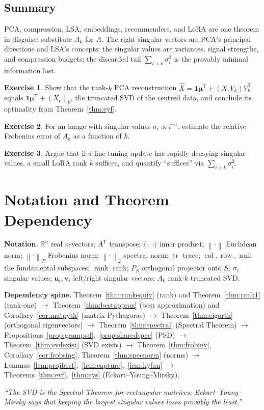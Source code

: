 \documentclass[11pt,oneside]{book}
\theoremstyle{plain}
\theoremstyle{definition}
\newtheorem{exercise}{Exercise}[chapter]
\theoremstyle{remark}
\newcommand{\R}{\mathbb{R}}
\newcommand{\tr}{\operatorname{tr}}
\newcommand{\rank}{\operatorname{rank}}
\newcommand{\col}{\operatorname{col}}
\newcommand{\row}{\operatorname{row}}
\newcommand{\nul}{\operatorname{null}}
\newcommand{\norm}[1]{\left\lVert #1 \right\rVert}
\newcommand{\fn}[1]{\norm{#1}_F}
\newcommand{\sn}[1]{\norm{#1}_2}
\newcommand{\T}{^{\mathsf T}}
\newcommand{\inner}[2]{\langle #1,\, #2\rangle}
\newcommand{\bu}{\mathbf{u}}
\newcommand{\bv}{\mathbf{v}}
\newcommand{\bmu}{\boldsymbol{\mu}}
\begin{document}
\section*{Summary}
PCA, compression, LSA, embeddings, recommenders, and LoRA are one theorem in disguise:
substitute $A_k$ for $A$. The right singular vectors are PCA's principal directions and
LSA's concepts; the singular values are variances, signal strengths, and compression
budgets; the discarded tail $\sum_{i>k}\sigma_i^2$ is the provably minimal information
lost.

\begin{exercise}
Show that the rank-$k$ PCA reconstruction $\hat X=\mathbf 1\bmu\T+(X_c V_k)V_k\T$ equals
$\mathbf 1\bmu\T+(X_c)_k$, the truncated SVD of the centred data, and conclude its
optimality from Theorem~\ref{thm:eyf}.
\end{exercise}
\begin{exercise}
For an image with singular values $\sigma_i\propto i^{-1}$, estimate the relative
Frobenius error of $A_k$ as a function of $k$.
\end{exercise}
\begin{exercise}
Argue that if a fine-tuning update has rapidly decaying singular values, a small LoRA
rank $k$ suffices, and quantify ``suffices'' via $\sum_{i>k}\sigma_i^2$.
\end{exercise}

\backmatter
\chapter{Notation and Theorem Dependency}

\textbf{Notation.}
$\R^n$ real $n$-vectors; $A\T$ transpose; $\inner{\cdot}{\cdot}$ inner product;
$\norm{\cdot}$ Euclidean norm; $\fn{\cdot}$ Frobenius norm; $\sn{\cdot}$ spectral norm;
$\tr$ trace; $\col,\row,\nul$ the fundamental subspaces; $\rank$ rank; $P_S$ orthogonal
projector onto $S$; $\sigma_i$ singular values; $\bu_i,\bv_i$ left/right singular
vectors; $A_k$ rank-$k$ truncated SVD.

\medskip
\noindent\textbf{Dependency spine.}
Theorem~\ref{thm:rankequiv} (rank) and Theorem~\ref{thm:rank1} (rank-one)
$\to$ Theorem~\ref{thm:bestapprox} (best approximation) and
Corollary~\ref{cor:matpyth} (matrix Pythagoras)
$\to$ Theorem~\ref{thm:eigorth} (orthogonal eigenvectors)
$\to$ Theorem~\ref{thm:spectral} (Spectral Theorem)
$\to$ Propositions~\ref{prop:grampsd},~\ref{prop:sharedspec} (PSD)
$\to$ Theorem~\ref{thm:svdexist} (SVD exists)
$\to$ Theorem~\ref{thm:frobinv}, Corollary~\ref{cor:frobsing},
Theorem~\ref{thm:specnorm} (norms)
$\to$ Lemmas~\ref{lem:projbest},~\ref{lem:capture},~\ref{lem:kyfan}
$\to$ Theorems~\ref{thm:eyf},~\ref{thm:eys} (Eckart--Young--Mirsky).

\vspace{1cm}
\begin{center}
\color{steel}\itshape
``The SVD is the Spectral Theorem for rectangular matrices; Eckart--Young--Mirsky says
that keeping the largest singular values loses provably the least.''
\end{center}
\end{document}
